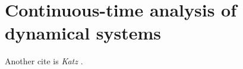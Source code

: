 \chapter{Continuous-time analysis of dynamical systems}
\label{chap:cont}

Another cite is \textsl{Katz} \cite[p. 41]{katz1953new}.
